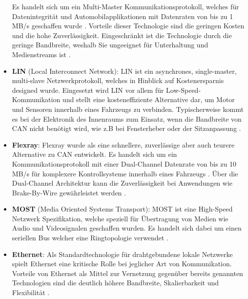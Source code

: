 \begin{itemize}
                Es handelt sich um ein Multi-Master Kommunikationsprotokoll, welches für Datenintegrität und Automobilapplikationen mit Datenraten von bis zu 1 MB/s geschaffen wurde \cite{wolf2004security}. Vorteile
                dieser Technologie sind die geringen Kosten und die hohe Zuverlässigkeit. Eingeschränkt ist die Technologie durch die geringe Bandbreite, weshalb Sie
                ungeeignet für Unterhaltung und Medienstreams ist \cite{TW_huang2018vehicle}.
                \item \textbf{LIN} (Local Interconnect Network): LIN ist ein asynchrones, single-master, multi-slave Netzwerkprotokoll, welches in Hinblick auf Kostenersparnis 
                designed wurde. Eingesetzt wird LIN vor allem für Low-Speed-Kommunikation und stellt eine kosteneffiziente Alternative dar, um Motor und Sensoren innerhalb 
                eines Fahrzeugs zu verbinden. Typischerweise kommt es bei der Elektronik des Innenraums zum Einsatz, wenn die Bandbreite von CAN nicht benötigt wird, wie z.B bei Fensterheber
                oder der Sitzanpassung \cite{TW_huang2018vehicle}.
                \item \textbf{Flexray}: Flexray wurde als eine schnellere, zuverlässige aber auch teurere Alternative zu CAN entwickelt. Es handelt sich um ein Kommunikationsprotokoll mit einer
                Dual-Channel Datenrate von bis zu 10 MB/s für komplexere Kontrollsysteme innerhalb eines Fahrzeugs \cite{wolf2004security}. Über die Dual-Channel Architektur kann die Zuverlässigkeit
                bei Anwendungen wie Brake-By-Wire gewährleistet werden \cite{TW_huang2018vehicle}. 
                \item \textbf{MOST} (Media Oriented Systems Transport): MOST ist eine High-Speed Netzwerk Spezifikation, welche speziell für Übertragung von Medien wie Audio und Videosignalen 
                geschaffen wurden. Es handelt sich dabei um einen seriellen Bus welcher eine Ringtopologie verwendet \cite{TW_huang2018vehicle}.
                \item \textbf{Ethernet}: Als Standardtechnologie für drahtgebundene lokale Netzwerke spielt Ethernet eine kritische Rolle bei jeglicher Art von Kommunikation.
                Vorteile von Ethernet als Mittel zur Vernetzung gegenüber bereits genannten Technologien sind die deutlich höhere Bandbreite, Skalierbarkeit und Flexibilität \cite{hank2013automotive}\cite{TW_huang2018vehicle}. 
            \end{itemize}

